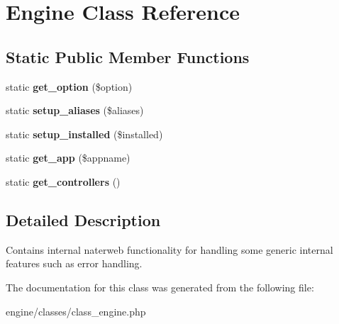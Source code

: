 \hypertarget{classEngine}{\section{Engine Class Reference}
\label{classEngine}
}
\subsection*{Static Public Member Functions}
\begin{DoxyCompactItemize}
\item 
\hypertarget{classEngine_ae77a1fd6d066cef1b05ac038d68b6013}{static {\bfseries get\-\_\-option} (\$option)}\label{classEngine_ae77a1fd6d066cef1b05ac038d68b6013}

\item 
\hypertarget{classEngine_ae942e1fdad4ffefdc861bca5dc5568f1}{static {\bfseries setup\-\_\-aliases} (\$aliases)}\label{classEngine_ae942e1fdad4ffefdc861bca5dc5568f1}

\item 
\hypertarget{classEngine_aa13f8e0bbeb3e30b1b477a6621aecd0b}{static {\bfseries setup\-\_\-installed} (\$installed)}\label{classEngine_aa13f8e0bbeb3e30b1b477a6621aecd0b}

\item 
\hypertarget{classEngine_a61525c41948786b0ec995bcda5bb0f47}{static {\bfseries get\-\_\-app} (\$appname)}\label{classEngine_a61525c41948786b0ec995bcda5bb0f47}

\item 
\hypertarget{classEngine_a5cb313f6b15efd21b85a36a536293d24}{static {\bfseries get\-\_\-controllers} ()}\label{classEngine_a5cb313f6b15efd21b85a36a536293d24}

\end{DoxyCompactItemize}


\subsection{Detailed Description}
Contains internal naterweb functionality for handling some generic internal features such as error handling. 

The documentation for this class was generated from the following file\-:\begin{DoxyCompactItemize}
\item 
engine/classes/class\-\_\-engine.\-php\end{DoxyCompactItemize}
